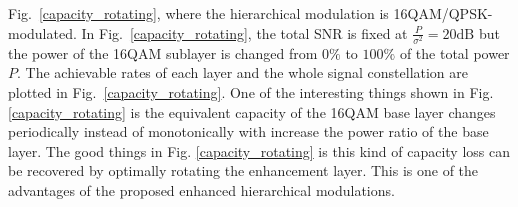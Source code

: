 \documentclass[10pt,fleqn, twocolumn]{IEEEtran}
\begin{document}
Fig.~\ref{capacity_rotating}, where the hierarchical modulation is
16QAM/QPSK-modulated. In Fig.~\ref{capacity_rotating}, the total
SNR is fixed at $\frac{P}{\sigma^2}=20\mbox{dB}$ but the power of
the 16QAM sublayer is changed from $0\%$ to $100\%$ of the total
power $P$. The achievable rates of each layer and the whole signal
constellation are plotted in Fig.~\ref{capacity_rotating}. One of
the interesting things shown in Fig. \ref{capacity_rotating} is
the equivalent capacity of the 16QAM base layer changes
periodically instead of monotonically with increase the power
ratio of the base layer. The good things in Fig.
\ref{capacity_rotating} is this kind of capacity loss can be
recovered by optimally rotating the enhancement layer. This is one
of the advantages of the proposed enhanced hierarchical
modulations.
\begin{figure}
\end{figure}
\end{document}
